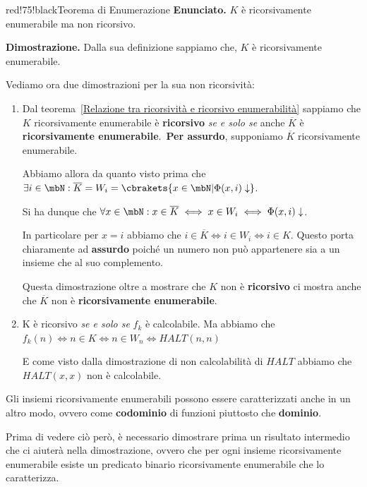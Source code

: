 \begin{halfframedbox}{red!75!black}{Teorema di Enumerazione}
  \textbf{Enunciato. } \(K\) è ricorsivamente enumerabile ma non ricorsivo.
  \begin{center}
    \textcolor{red!75!black}{\hdashrule[0.5ex]{18cm}{1pt}{3mm 3pt 1mm 2pt}}
  \end{center}
  \textbf{Dimostrazione. } Dalla sua definizione sappiamo che, \(K\) è ricorsivamente enumerabile.

  Vediamo ora due dimostrazioni per la sua non ricorsività:
  \begin{enumerate}
    \item Dal teorema~\ref{Relazione tra ricorsività e ricorsivo enumerabilità} sappiamo che \(K\) ricorsivamente enumerabile è \textbf{ricorsivo} \textit{se e solo se} anche \(\overline{K}\) è \textbf{ricorsivamente enumerabile}.\ \textbf{Per assurdo}, supponiamo \(\overline{K}\) ricorsivamente enumerabile.

    Abbiamo allora da quanto visto prima che \(\exists i \in \mbN: \overline{K}=W_i=\cbrakets{ x \in \mbN \vert \Phi(x,i)\downarrow}\).

    Si ha dunque che \(\forall x \in \mbN: x \in \overline{K} \iff x \in W_i \iff \Phi(x,i)\downarrow\).

    In particolare per \(x = i\) abbiamo che \(i \in \overline{K} \iff i \in W_i \iff i \in K\). Questo porta chiaramente ad \textbf{assurdo} poiché un numero non può appartenere sia a un insieme che al suo complemento.

    Questa dimostrazione oltre a mostrare che \(K\) non è \textbf{ricorsivo} ci mostra anche che \(\overline{K}\) non è \textbf{ricorsivamente enumerabile}.

    \item K è ricorsivo \textit{se e solo se} \(f_k\) è calcolabile. Ma abbiamo che \(f_k(n) \iff n \in K \iff n \in W_n \iff \textit{HALT}(n,n)\)

    E come visto dalla dimostrazione di non calcolabilità di \(\textit{HALT}\) abbiamo che \(\textit{HALT}(x,x)\) non è calcolabile.
  \end{enumerate}
\end{halfframedbox}

Gli insiemi ricorsivamente enumerabili possono essere caratterizzati anche in un altro modo, ovvero come \textbf{codominio} di funzioni piuttosto che \textbf{dominio}.

Prima di vedere ciò però, è necessario dimostrare prima un risultato intermedio che ci aiuterà nella dimostrazione, ovvero che per ogni insieme ricorsivamente enumerabile esiste un predicato binario ricorsivamente enumerabile che lo caratterizza.

